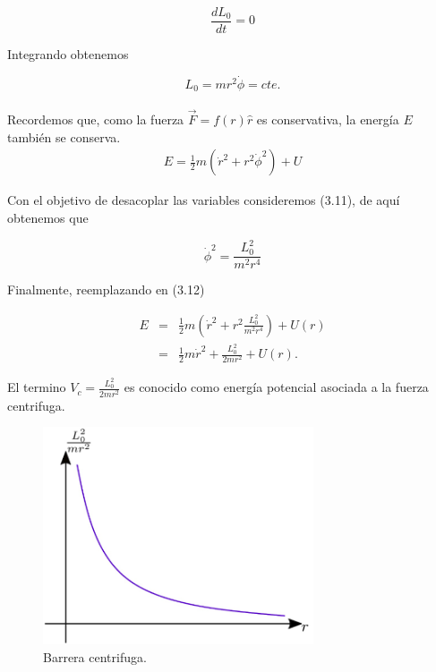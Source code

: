 \documentclass[12pt]{report}
\begin{document}
\begin{equation}
\frac{d L_0}{dt} =0
\end{equation}

Integrando obtenemos

\begin{equation}
L_0 = mr^2 \dot{\phi}=cte. 
\end{equation}
\\



Recordemos que, como la fuerza $\vec{F}=f(r)\hat{r}$ es conservativa, la energía $E$ también se conserva. \\

\begin{eqnarray}
E=\frac{1}{2} m \left( \dot{r}^2 + r^2 \dot{\phi}^2 \right) + U
\end{eqnarray} 

Con el objetivo de desacoplar las variables consideremos (3.11), de aquí obtenemos que 

\begin{equation}
\dot{\phi}^2 = \frac{L_0^2}{m^2 r^4}
\end{equation}

Finalmente, reemplazando en (3.12)

\begin{eqnarray}
E&=&\frac{1}{2}m \left( \dot{r}^2 + r^2 \frac{L_0^2}{m^2 r^4} \right) +  U(r) \\
&=& \frac{1}{2}m\dot{r}^2 +\frac{L_0^2}{2m r^2} +  U(r).
\end{eqnarray}


El termino $\displaystyle V_c=\frac{L_0^2}{2mr^2}$ es conocido como energía potencial asociada a la fuerza centrifuga. \\


\begin{figure}[H]
	\begin{center}
	\includegraphics[width=8cm]{figura121.png} 
	\caption{Barrera centrifuga.}
	\label{fig.1}
	\end{center}
\end{figure}
\end{document}

